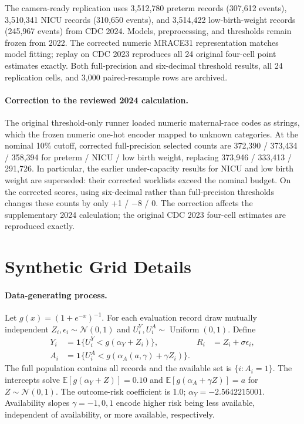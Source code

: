 \documentclass{article}
\begin{document}
The camera-ready replication uses 3,512,780 preterm records (307,612 events),
3,510,341 NICU records (310,650 events), and 3,514,422 low-birth-weight records
(245,967 events) from CDC 2024. Models, preprocessing, and thresholds remain
frozen from 2022. The corrected numeric MRACE31 representation matches model
fitting; replay on CDC 2023 reproduces all 24 original four-cell point
estimates exactly. Both full-precision and six-decimal threshold results,
all 24 replication cells, and 3,000 paired-resample rows are archived.

\paragraph{Correction to the reviewed 2024 calculation.}
The original threshold-only runner loaded numeric maternal-race codes as strings,
which the frozen numeric one-hot encoder mapped to unknown categories. At the
nominal 10\% cutoff, corrected full-precision selected counts are
372,390 / 373,434 / 358,394 for preterm / NICU / low birth weight, replacing
373,946 / 333,413 / 291,726. In particular, the earlier under-capacity results
for NICU and low birth weight are superseded: their corrected worklists exceed
the nominal budget. On the corrected scores, using six-decimal rather than
full-precision thresholds changes these counts by only +1 / $-8$ / 0.
The correction affects the supplementary 2024 calculation; the original
CDC 2023 four-cell estimates are reproduced exactly.

\FloatBarrier

\section{Synthetic Grid Details}
\label{app:synthetic}

\paragraph{Data-generating process.}
Let $g(x)=(1+e^{-x})^{-1}$. For each evaluation record draw mutually independent
$Z_i,\epsilon_i\sim\mathcal N(0,1)$ and
$U_i^Y,U_i^A\sim\operatorname{Uniform}(0,1)$. Define
\begin{align}
 Y_i&=\mathbf 1\{U_i^Y<g(\alpha_Y+Z_i)\}, &
 R_i&=Z_i+\sigma\epsilon_i,\label{eq:synthetic_y}\\
 A_i&=\mathbf 1\{U_i^A<g(\alpha_A(a,\gamma)+\gamma Z_i)\}.&&
 \label{eq:synthetic_a}
\end{align}
The full population contains all records and the available set is
$\{i:A_i=1\}$. The intercepts solve
$\mathbb E[g(\alpha_Y+Z)]=0.10$ and
$\mathbb E[g(\alpha_A+\gamma Z)]=a$ for $Z\sim\mathcal N(0,1)$.
The outcome-risk coefficient is 1.0; $\alpha_Y=-2.5642215001$.
Availability slopes $\gamma=-1,0,1$ encode higher risk being less available,
independent of availability, or more available, respectively.
\end{document}

